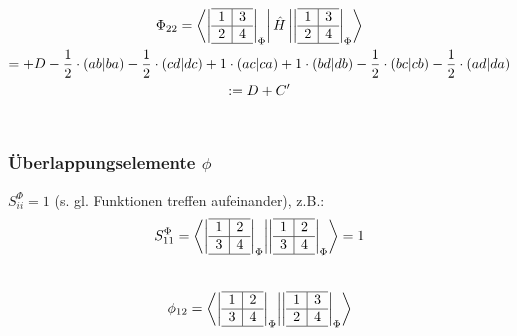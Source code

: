 \documentclass[12pt,a4paper]{article}
\begin{document}
\begin{gather}
\Phi_{22} = \bra{
\left|
  \begin{array}{c|c}
  \hline 
    1 & 3 \\ \hline 
    2 & 4 \\
    \hline 
  \end{array}
\right| _{\Phi}
} \hat{H} \ket{
\left|
  \begin{array}{c|c}
  \hline 
    1 & 3 \\ \hline 
    2 & 4 \\
    \hline 
  \end{array}
\right| _{\Phi}
} \\
= + D -  \frac{1}{2} \cdot (ab|ba) - \frac{1}{2} \cdot (cd|dc) + 1 \cdot (ac|ca) + 1 \cdot (bd|db) - \frac{1}{2} \cdot (bc|cb) - \frac{1}{2} \cdot (ad|da)
\\
\label{eq:def_C_Strich}
:= D + C' 
\end{gather} \\



\subsubsection{Überlappungselemente $\phi$}
$S^\Phi_{ii} = 1$ (s. gl. Funktionen treffen aufeinander), z.B.: 
$$S^\Phi_{11} = \bra{
\left|
  \begin{array}{c|c}
  \hline 
    1 & 2 \\ \hline 
    3 & 4 \\
    \hline 
  \end{array}
\right| _{\Phi}
} \ket{
\left|
  \begin{array}{c|c}
  \hline 
    1 & 2 \\ \hline 
    3 & 4 \\
    \hline 
  \end{array}
\right| _{\Phi}
} = 1 $$ \\


$$\phi_{12} = \bra{
\left|
  \begin{array}{c|c}
  \hline 
    1 & 2 \\ \hline 
    3 & 4 \\
    \hline 
  \end{array}
\right| _{\Phi}
}  \ket{
\left|
  \begin{array}{c|c}
  \hline 
    1 & 3 \\ \hline 
    2 & 4 \\
    \hline 
  \end{array}
\right| _{\Phi}
} $$
\end{document}
